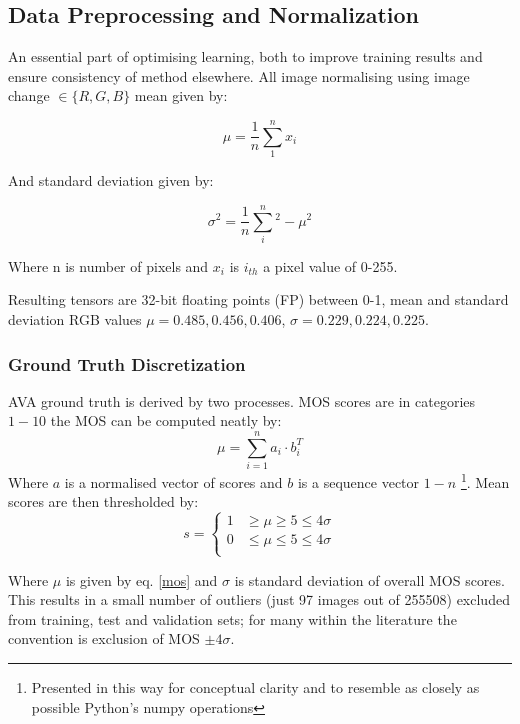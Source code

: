 \subsection{Data Preprocessing and Normalization}
An essential part of optimising learning, both to improve training results and ensure consistency of method elsewhere.  All image  normalising using image change $\in\{R,G,B\}$ mean given by:

\begin{equation}
    \mu = \dfrac{1}{n}\sum^n_1x_i
\end{equation}

And standard deviation given by:

\begin{equation}
    \sigma^2 = \dfrac{1}{n}\sum^n_i^2-\mu^2
\end{equation}
 
Where n is number of pixels and $x_i$ is $i_{th}$ a pixel value of 0-255. 

Resulting tensors are 32-bit floating points (FP) between 0-1, mean and standard deviation  RGB values $\mu = 0.485, 0.456, 0.406$, $ \sigma = 0.229, 0.224, 0.225$.

\subsubsection{Ground Truth Discretization}

AVA ground truth is derived by two processes. MOS scores are in categories $1-10$ the MOS  can be computed neatly by: 
\begin{equation}
    \mu = \sum_{i=1}^n a_i\cdot b_i^T
    \label{mos}
\end{equation}
Where $a$ is a normalised vector of scores and $b$ is a sequence vector $1-n$ \footnote{Presented in this way for conceptual clarity and to resemble as closely as possible Python's numpy operations}. Mean scores are then thresholded by: 
\begin{equation}
  {s} =
    \begin{cases}
      1 & \geq \mu \geq 5 \leq 4\sigma\\
      0 & \leq \mu \leq 5 \leq 4\sigma\\
    \end{cases}
    \label{eq:threshold} 
\end{equation}

Where $\mu$ is given by eq. \ref{mos} and $\sigma$ is standard deviation of overall MOS scores. This results in a small number of outliers (just 97 images out of 255508) excluded from training, test and validation sets; for many within the literature the convention is exclusion of MOS $\pm 4\sigma$. 

